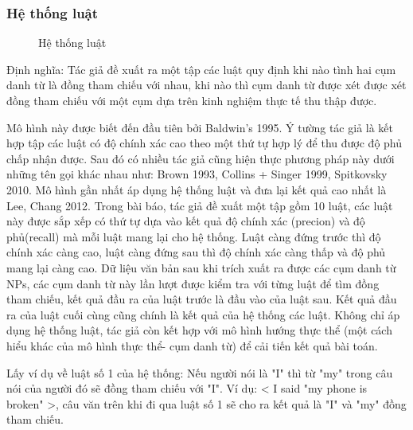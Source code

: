 \documentclass[12pt]{extarticle}
\begin{document}
				\subsubsection*{Hệ thống luật}
					\begin{figure}
						\centering
						
						\caption{Hệ thống luật}
					\end{figure}
					\par Định nghĩa: Tác giả đề xuất ra một tập các luật quy định khi nào tình hai cụm danh từ là đồng tham chiếu với nhau, khi nào thì cụm danh từ được xét được xét đồng tham chiếu với một cụm dựa trên kinh nghiệm thực tế thu thập được.
					\par Mô hình này được biết đến đầu tiên bởi Baldwin’s 1995. Ý tường tác giả là kết hợp tập các luật có độ chính xác cao theo một thứ tự hợp lý để thu được độ phủ chấp nhận được. Sau đó có nhiều tác giả cũng hiện thực phương pháp này dưới những tên gọi khác nhau như: Brown 1993, Collins + Singer 1999, Spitkovsky 2010. Mô hình gần nhất áp dụng hệ thống luật và đưa lại kết quả cao nhất là Lee, Chang 2012. Trong bài báo, tác giả đề xuất một tập gồm 10 luật, các luật này được sắp xếp có thứ tự dựa vào kết quả độ chính xác (precion) và độ phủ(recall) mà mỗi luật mang lại cho hệ thống. Luật càng đứng trước thì độ chính xác càng cao, luật càng đứng sau thì độ chính xác càng thấp và độ phủ mang lại càng cao. Dữ liệu văn bản sau khi trích xuất ra được các cụm danh từ NPs, các cụm danh từ này lần lượt được kiểm tra với từng luật để tìm đồng tham chiếu, kết quả đầu ra của luật trước là đầu vào của luật sau. Kết quả đầu ra của luật cuối cùng cũng chính là kết quả của hệ thống các luật. Không chỉ áp dụng hệ thống luật, tác giả còn kết hợp với mô hình hướng thực thể (một cách hiểu khác của mô hình thực thể- cụm danh từ) để cải tiến kết quả bài toán.					
					\par Lấy ví dụ về luật số 1 của hệ thống: Nếu người nói là "I" thì từ "my" trong câu nói của người đó sẽ đồng tham chiếu với "I". Ví dụ: < I said "my phone is broken" >, câu văn trên khi đi qua luật số 1 sẽ cho ra kết quả là "I" và "my" đồng tham chiếu.
\end{document}
